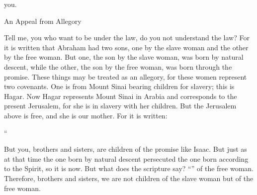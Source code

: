 {you.
\par }{\SH An Appeal from Allegory
\par }{\PP {}Tell
me,
you who want
to be
under
the law,
do you
not
understand
the law?
For
it is written
that
Abraham
had
two
sons,
one
by
the slave woman
and
the other
by
the free woman.
But
one, the son by
the slave woman,
was born
by
natural descent,
while the other, the son by
the free woman,
was born through
the promise.
These things may be treated as an allegory,
for these women
represent two
covenants.
One
is
from
Mount
Sinai
bearing children
for
slavery;
this
is
Hagar.
Now
Hagar
represents
Mount
Sinai
in
Arabia
and
corresponds
to the present
Jerusalem,
for
she is in slavery
with
her
children.
But
the Jerusalem
above
is
free,
and she is
our
mother.
For
it is written:
\par }{\Q “{}
\par }{
\par }{
\par }{
\par }{\PP {}But you,
brothers and sisters,
are
children
of the promise
like
Isaac.
But
just as
at that time
the one born
by
natural descent
persecuted
the one born according to
the Spirit,
so
it is now.
But
what
does the scripture
say? “{}” of the free woman.
Therefore,
brothers and sisters,
we are
not
children
of
the slave woman
but
of the free woman.

}
